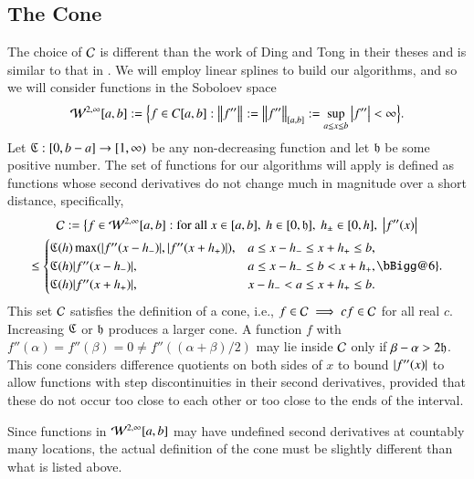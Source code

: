 \documentclass[review]{elsarticle}
\makeatletter
\newcommand{\Vast}{\bBigg@{6}}
\newcommand{\Vastr}{\mathclose\Vast}
\makeatother
\begin{document}
\subsection{The Cone}
The choice of $\cc$ is different than the work of Ding and Tong in their theses and is similar to that in \cite{HicRazYun15a}. We will employ linear splines to build our algorithms, and so we will consider functions in the Soboloev space
\[
\cw^{2,\infty}[a,b] : = \Bigl \{f \in C[a,b] : \norm{f''} : = \norm[{[a,b]}]{f''} : = \sup_{a \le x \le b} \abs{f''} <  \infty \Bigr\}.
\]
Let $\fC : [0,b-a] \to [1,\infty)$ be any non-decreasing function and let $\fh$ be some positive number.  The set of functions for our algorithms will apply is defined as functions whose second derivatives do not change much in magnitude over a short distance, specifically,
\begin{multline} \label{condef}
\cc : = \bigl \{ f \in \cw^{2,\infty}[a,b] : \text{for all }x \in [a,b], \ h \in [0, \fh], \ h_{\pm} \in [0,h],  \  \abs{f''(x)} \\
\le \begin{cases} \fC(h) \max(|f''(x-h_-)|, |f''(x+h_+)|), & a \le x-h_- \le x + h_+ \le b,\\
\fC(h) |f''(x-h_-)|, & a \le x-h_- \le b <  x + h_+, \\
\fC(h) |f''(x+h_+)|, & x-h_- < a \le x + h_+ \le b.
\end{cases}
 \Vastr \}.
\end{multline}
This set $\cc$ satisfies the definition of a cone, i.e., $f \in \cc \implies cf \in \cc$ for all real $c$.  Increasing $\fC$ or $\fh$ produces a larger cone.  A function $f$ with $f''(\alpha) = f''(\beta) = 0 \ne f''((\alpha+\beta)/2)$  may lie inside $\cc$ only if $\beta - \alpha > 2\fh$.  This cone considers difference quotients on both sides of $x$ to bound $\abs{f''(x)}$ to allow functions with step discontinuities in their second derivatives, provided that these do not occur too close to each other or too close to the ends of the interval.

Since functions in $\cw^{2,\infty}[a,b]$ may have undefined second derivatives at countably many locations, the actual definition of the cone must be slightly different than what is listed above.
\end{document}
